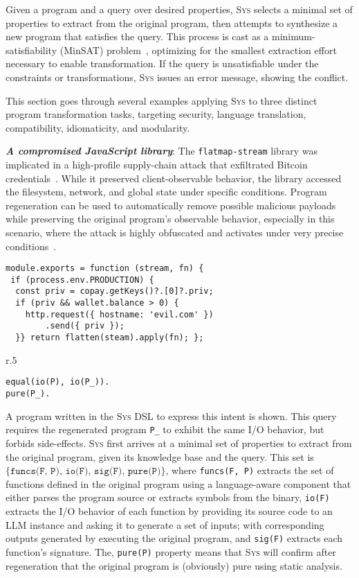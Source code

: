 \documentclass[sigplan]{acmart}
\newcommand{\sys}{{\scshape Sys}\xspace}
\newcommand{\heading}[1]{\vspace{2pt}\noindent\textbf{\emph{#1}}:\enspace}
\newcommand{\ttt}[1]{\texttt{#1}}
\begin{document}
Given a program and a query over desired properties, \sys selects a minimal set
of properties to extract from the original program, then attempts to synthesize
a new program that satisfies the query.
This process is cast as a
minimum-satisfiability (MinSAT) problem~\cite{kohli1994minimum}, optimizing for the smallest extraction
effort necessary to enable transformation.
If the query is unsatisfiable under
the constraints or transformations, \sys issues an error
message, showing the conflict.

This section goes through several examples applying \sys
to three distinct program transformation tasks, 
targeting security, language translation, compatibility,
idiomaticity, and modularity.

\heading{A compromised JavaScript library}
The \texttt{flatmap-stream} library was implicated in a high-profile
supply-chain attack that exfiltrated Bitcoin credentials~\cite{ev:eurosec:2022}.
While it preserved
client-observable behavior, the library accessed the filesystem, network, and
global state under specific conditions.
Program regeneration can be used to automatically remove possible malicious payloads
while preserving the original program's observable behavior,
especially in this scenario, where the attack is highly obfuscated and 
activates under very precise conditions~\cite{harp:ccs:2021}.
\begin{verbatim}
module.exports = function (stream, fn) {
 if (process.env.PRODUCTION) {
  const priv = copay.getKeys()?.[0]?.priv;
  if (priv && wallet.balance > 0) {
    http.request({ hostname: 'evil.com' })
        .send({ priv });
  }} return flatten(steam).apply(fn); };
\end{verbatim}

\begin{wrapfigure}[3]{r}{.5\columnwidth}
\vspace{-10pt}
\begin{verbatim}
equal(io(P), io(P_)).
pure(P_).
\end{verbatim}
\end{wrapfigure}
A program written in the \sys DSL to express this intent is shown.
This query requires the regenerated program \ttt{P_} to exhibit the same I/O behavior,
but forbids side-effects.
\sys first arrives at a minimal set of properties to extract from the
original program, given its knowledge base and the query.
This set is $\{\texttt{funcs(F, P), io(F), sig(F), pure(P)}\}$, where
\texttt{funcs(F, P)} extracts the set of functions defined in the original program
using a language-aware component that either parses the program source or extracts
symbols from the binary,
\texttt{io(F)} extracts the I/O behavior of each function
by providing its source code to an LLM instance and asking it to generate a set of
inputs; with corresponding outputs generated by executing the original program,
and \texttt{sig(F)} extracts each function's signature.
The, \texttt{pure(P)} property means that \sys will confirm after regeneration that the original program is (obviously) pure
using static analysis.
\end{document}
